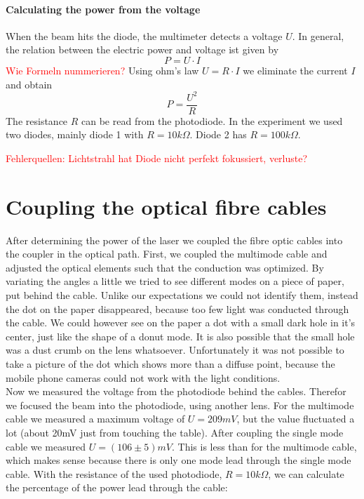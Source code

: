 \documentclass{article}
\begin{document}
\paragraph{Calculating the power from the voltage}

When the beam hits the diode, the multimeter detects a voltage $U$. In general, the relation between the electric power and voltage ist given by 
\[ P = U \cdot I \] 
\textcolor{red}{Wie Formeln nummerieren?}
Using ohm's law $ U= R \cdot I$ we eliminate the current $I$ and obtain 
\[P = \frac{U^2}{R}\]
The resistance $R$ can be read from the photodiode. In the experiment we used two diodes, mainly diode 1 with $R=10 k\Omega$. Diode 2 has $R= 100 k\Omega$.

\textcolor{red}{Fehlerquellen: Lichtstrahl hat Diode nicht perfekt fokussiert, verluste?}

\section{Coupling the optical fibre cables}

After determining the power of the laser we coupled the fibre optic cables into the coupler in the optical path. First, we coupled the multimode cable and adjusted the optical elements such that the conduction was optimized. By variating the angles a little we tried to see different modes on a piece of paper, put behind the cable. Unlike our expectations we could not identify them, instead the dot on the paper disappeared, because too few light was conducted through the cable. We could however see on the paper a dot with a small dark hole in it's center, just like the shape of a donut mode. It is also possible that the small hole was a dust crumb on the lens whatsoever. Unfortunately it was not possible to take a picture of the dot which shows more than a diffuse point, because the mobile phone cameras could not work with the light conditions.\\

Now we measured the voltage from the photodiode behind the cables. Therefor we focused the beam into the photodiode, using another lens. For the multimode cable we measured a maximum voltage of $U=209mV$, but the value fluctuated a lot (about 20mV just from touching the table). After coupling the single mode cable we measured $U=(106 \pm 5)mV$. This is less than for the multimode cable, which makes sense because there is only one mode lead through the single mode cable. With the resistance of the used photodiode, $R = 10k\Omega$, we can calculate the percentage of the power lead through the cable:
\end{document}

